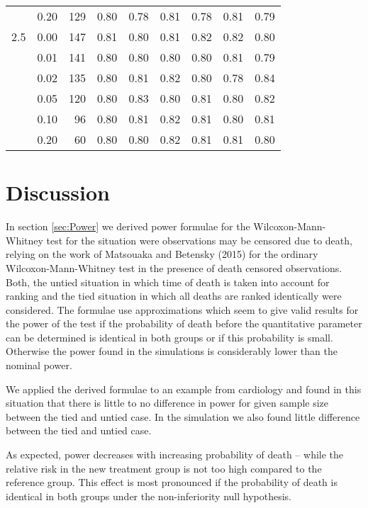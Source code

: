 \documentclass[bimj,fleqn]{w-art}\usepackage[]{graphicx}\usepackage[]{color}
\theoremstyle{plain}
\theoremstyle{definition}
\begin{document}
\begin{table}[ht]
\begin{tabular}{lrrrrrrrr}
    & 0.20 & 129 & 0.80 & 0.78 & 0.81 & 0.78 & 0.81 & 0.79 \\ 
  2.5 & 0.00 & 147 & 0.81 & 0.80 & 0.81 & 0.82 & 0.82 & 0.80 \\ 
    & 0.01 & 141 & 0.80 & 0.80 & 0.80 & 0.80 & 0.81 & 0.79 \\ 
    & 0.02 & 135 & 0.80 & 0.81 & 0.82 & 0.80 & 0.78 & 0.84 \\ 
    & 0.05 & 120 & 0.80 & 0.83 & 0.80 & 0.81 & 0.80 & 0.82 \\ 
    & 0.10 & 96 & 0.80 & 0.81 & 0.82 & 0.81 & 0.80 & 0.81 \\ 
    & 0.20 & 60 & 0.80 & 0.80 & 0.82 & 0.81 & 0.81 & 0.80 \\ 
   \hline
\end{tabular}
\end{table}




\section{Discussion}
\label{sec:Discussion}
In section \ref{sec:Power} we derived power formulae for the Wilcoxon-Mann-Whitney
test for the situation were observations may be censored due to death, relying
on the work of Matsouaka and Betensky (2015) for the ordinary Wilcoxon-Mann-Whitney
test in the presence of death censored observations. Both, the untied situation
in which time of death is taken into account for ranking and the tied situation
in which all deaths are ranked identically were considered. The formulae use
approximations which seem to give valid results for the power of the test if the
probability of death before the quantitative parameter can be determined is
identical in both groups or if this probability is small. Otherwise the power
found in the simulations is considerably lower than the nominal power.

We applied the derived formulae to an example from cardiology and found in this
situation that there is little to no difference in power for given sample size
between the tied and untied case. In the simulation we also found little
difference between the tied and untied case.

As expected, power decreases with increasing probability of death -- while the
relative risk in the new treatment group is not too high compared to the reference
group. This effect is most pronounced if the probability of death is identical in
both groups under the non-inferiority null hypothesis.
\end{document}
